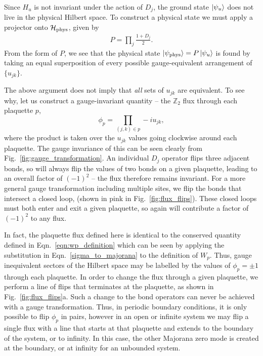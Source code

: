 Since $H_u$ is not invariant under the action of $D_j$, the ground state $\ket{\psi_u}$ does not live in the physical Hilbert space. To construct a physical state we must apply a projector onto $\mathcal{H}_{\textup{phys}}$, given by
\begin{align}
    P = \prod_j \frac{1 + D_j}2.
\end{align}
From the form of $P$, we see that the physical state $\ket{\psi_{\textup{phys}}} = P \ket{\psi_u}$ is found by taking an equal superposition of every possible gauge-equivalent arrangement of~$\{u_{jk}\}$.

The above argument does not imply that {\it all} sets of $u_{jk}$ are equivalent. To see why, let us construct a gauge-invariant quantity -- the $\mathbb Z_2$ flux through each plaquette $p$,
\begin{equation} \label{eqn:z2_flux_def}
    \phi_p = \prod_{(j,k) \in p} -iu_{jk},
\end{equation}
where the product is taken over the $u_{jk}$ values going clockwise around each plaquette. The gauge invariance of this can be seen clearly from Fig.~\ref{fig:gauge_transformation}. An individual $D_j$ operator flips three adjacent bonds, so will always flip the values of two bonds on a given plaquette, leading to an overall factor of $(-1)^2$ -- the flux therefore remains invariant. For a more general gauge transformation including multiple sites, we flip the bonds that intersect a closed loop, (shown in pink in Fig.~\ref{fig:flux_flips}). These closed loops must both enter and exit a given plaquette, so again will contribute a factor of $(-1)^2$ to any flux.

In fact, the plaquette flux defined here is identical to the conserved quantity defined in Eqn.~\ref{eqn:wp_definition} which can be seen by applying the substitution in Eqn.~\ref{sigma_to_majorana} to the definition of $W_p$. Thus, gauge inequivalent sectors of the Hilbert space may be labelled by the values of $\phi_p = \pm 1$ through each plaquette. In order to change the flux through a given plaquette, we perform a line of flips that terminates at the plaquette, as shown in Fig.~\ref{fig:flux_flips}a. Such a change to the bond operators can never be achieved with a gauge transformation. Thus, in periodic boundary conditions, it is only possible to flip $\phi_p$ in pairs, however in an open or infinite system we may flip a single flux with a line that starts at that plaquette and extends to the boundary of the system, or to infinity. In this case, the other Majorana zero mode is created at the boundary, or at infinity for an unbounded system.

